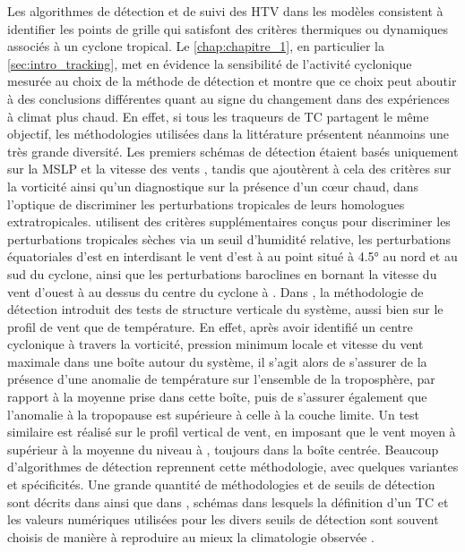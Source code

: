 \documentclass[../main.tex]{subfiles}
\begin{document}
Les algorithmes de détection et de suivi des HTV dans les modèles consistent à identifier les points de grille qui satisfont des critères thermiques ou
dynamiques associés à un cyclone tropical. Le \cref{chap:chapitre_1}, en particulier la \cref{sec:intro_tracking}, met en évidence la sensibilité de l'activité
cyclonique mesurée au choix de la méthode de détection et montre que ce choix peut aboutir à des conclusions différentes quant au signe du changement dans des
expériences à climat plus chaud. En effet, si tous les traqueurs de TC partagent le même objectif, les méthodologies utilisées dans la littérature présentent
néanmoins une très grande diversité. Les premiers schémas de détection étaient basés uniquement sur la MSLP et la vitesse des vents
\parencite{bengtsson_simulation_1982,broccoli_can_1990}, tandis que \textcite{haarsma_tropical_1993,bengtsson_hurricanetype_1995} ajoutèrent à cela des critères
sur la vorticité ainsi qu'un diagnostique sur la présence d'un cœur chaud, dans l'optique de discriminer les perturbations tropicales de leurs homologues
extratropicales. \textcite{wu_gcm_1992} utilisent des critères supplémentaires conçus pour discriminer les perturbations tropicales sèches via un seuil
d'humidité relative, les perturbations équatoriales d'est en interdisant le vent d'est à  au point situé à \ang{4.5} au nord et au sud du cyclone,
ainsi que les perturbations baroclines en bornant la vitesse du vent d'ouest à  au dessus du centre du cyclone à . Dans
\textcite{bengtsson_hurricanetype_1995}, la méthodologie de détection introduit des tests de structure verticale du système, aussi bien sur le profil de vent
que de température. En effet, après avoir identifié un centre cyclonique à travers la vorticité, pression minimum locale et vitesse du vent maximale dans une
boîte autour du système, il s'agit alors de s'assurer de la présence d'une anomalie de température sur l'ensemble de la troposphère, par rapport à la moyenne
prise dans cette boîte, puis de s'assurer également que l'anomalie à la tropopause est supérieure à celle à la couche limite. Un test similaire est réalisé sur
le profil vertical de vent, en imposant que le vent moyen à  supérieur à la moyenne du niveau à , toujours dans la boîte centrée. Beaucoup
d'algorithmes de détection reprennent cette méthodologie, avec quelques variantes et spécificités. Une grande quantité de méthodologies et de seuils de
détection sont décrits dans \textcite{walsh_objectively_2007} ainsi que dans \cite[][Annexe B]{ullrich_tempestextremes_2017}, schémas dans lesquels la
définition d'un TC et les valeurs numériques utilisées pour les divers seuils de détection sont souvent choisis de manière à reproduire au mieux la climatologie
observée \parencite{walsh_objectively_2007,tory_development_2013}.
\end{document}
